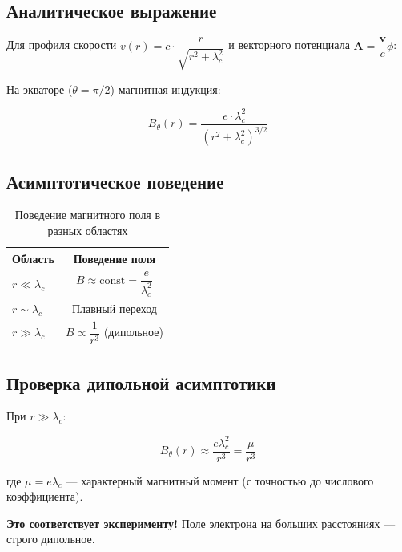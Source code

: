 \documentclass[12pt,a4paper]{article}
\begin{document}
\subsection{Аналитическое выражение}

Для профиля скорости $v(r) = c \cdot \dfrac{r}{\sqrt{r^2 + \lambda_c^2}}$ и векторного потенциала $\mathbf{A} = \dfrac{\mathbf{v}}{c}\phi$:

На экваторе ($\theta = \pi/2$) магнитная индукция:

\begin{equation}
    B_\theta(r) = \frac{e \cdot \lambda_c^2}{(r^2 + \lambda_c^2)^{3/2}}
\end{equation}

\subsection{Асимптотическое поведение}

\begin{table}[h]
\centering
\caption{Поведение магнитного поля в разных областях}
\label{tab:field}
\begin{tabular}{lc}
\toprule
\textbf{Область} & \textbf{Поведение поля} \\
\midrule
$r \ll \lambda_c$ & $B \approx \text{const} = \dfrac{e}{\lambda_c^2}$ \\
$r \sim \lambda_c$ & Плавный переход \\
$r \gg \lambda_c$ & $B \propto \dfrac{1}{r^3}$ (дипольное) \\
\bottomrule
\end{tabular}
\end{table}

\subsection{Проверка дипольной асимптотики}

При $r \gg \lambda_c$:

\begin{equation}
    B_\theta(r) \approx \frac{e \lambda_c^2}{r^3} = \frac{\mu}{r^3}
\end{equation}

где $\mu = e\lambda_c$ --- характерный магнитный момент (с точностью до числового коэффициента).

\textbf{Это соответствует эксперименту!} Поле электрона на больших расстояниях --- строго дипольное.

\end{document}
